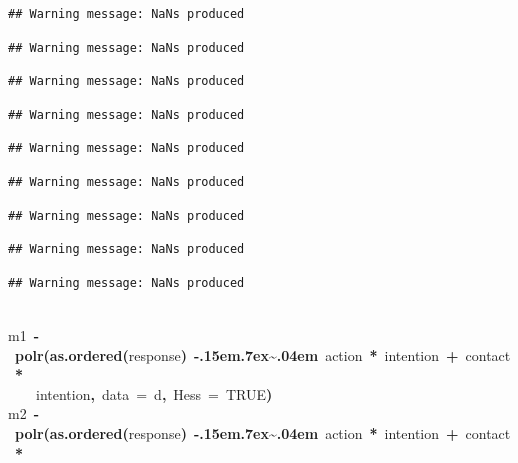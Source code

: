\documentclass{article}
\makeatletter
\newcommand{\hlnumber}[1]{\textcolor[rgb]{0,0,0}{#1}}%
\newcommand{\hlfunctioncall}[1]{\textcolor[rgb]{.5,0,.33}{\textbf{#1}}}%
\newcommand{\hlkeyword}[1]{\textbf{#1}}%
\newcommand{\hlargument}[1]{\textcolor[rgb]{.69,.25,.02}{#1}}%
\newcommand{\hlassignement}[1]{\textbf{#1}}%
\newcommand{\hlsymbol}[1]{#1}%
\def\urltilda{\kern -.15em\lower .7ex\hbox{\~{}}\kern .04em}%
\newcommand{\hlstd}[1]{\textcolor[rgb]{0,0,0}{#1}}%
\newenvironment{kframe}{%
 \def\FrameCommand##1{\hskip\@totalleftmargin \hskip-\fboxsep
 \colorbox{shadecolor}{##1}\hskip-\fboxsep
     \hskip-\linewidth \hskip-\@totalleftmargin \hskip\columnwidth}%
 \MakeFramed {\advance\hsize-\width
   \@totalleftmargin\z@ \linewidth\hsize
   \@setminipage}}%
 {\par\unskip\endMakeFramed}
\newenvironment{knitrout}{}{} %
\makeatother
\begin{document}
\begin{knitrout}
{\begin{kframe}
\begin{verbatim}
## Warning message: NaNs produced
\end{verbatim}
\begin{verbatim}
## Warning message: NaNs produced
\end{verbatim}
\begin{verbatim}
## Warning message: NaNs produced
\end{verbatim}
\begin{verbatim}
## Warning message: NaNs produced
\end{verbatim}
\begin{verbatim}
## Warning message: NaNs produced
\end{verbatim}
\begin{verbatim}
## Warning message: NaNs produced
\end{verbatim}
\begin{verbatim}
## Warning message: NaNs produced
\end{verbatim}
\begin{verbatim}
## Warning message: NaNs produced
\end{verbatim}
\begin{verbatim}
## Warning message: NaNs produced
\end{verbatim}
\begin{flushleft}
\ttfamily\noindent
\hspace*{\fill}\\
\hlstd{}\hlsymbol{m1}{\ }\hlassignement{\usebox{\hlnormalsizeboxlessthan}-}{\ }\hlfunctioncall{polr}\hlkeyword{(}\hlfunctioncall{as.ordered}\hlkeyword{(}\hlsymbol{response}\hlkeyword{)}{\ }\hlkeyword{\urltilda{}}{\ }\hlsymbol{action}{\ }\hlkeyword{*}{\ }\hlsymbol{intention}{\ }\hlkeyword{+}{\ }\hlsymbol{contact}{\ }\hlkeyword{*}\hspace*{\fill}\\
\hlstd{}{\ }{\ }{\ }{\ }\hlsymbol{intention}\hlkeyword{,}{\ }\hlargument{data}{\ }\hlargument{=}{\ }\hlsymbol{d}\hlkeyword{,}{\ }\hlargument{Hess}{\ }\hlargument{=}{\ }\hlnumber{TRUE}\hlkeyword{)}\hspace*{\fill}\\
\hlstd{}\hlsymbol{m2}{\ }\hlassignement{\usebox{\hlnormalsizeboxlessthan}-}{\ }\hlfunctioncall{polr}\hlkeyword{(}\hlfunctioncall{as.ordered}\hlkeyword{(}\hlsymbol{response}\hlkeyword{)}{\ }\hlkeyword{\urltilda{}}{\ }\hlsymbol{action}{\ }\hlkeyword{*}{\ }\hlsymbol{intention}{\ }\hlkeyword{+}{\ }\hlsymbol{contact}{\ }\hlkeyword{*}\hspace*{\fill}\\

\end{flushleft}
\end{kframe}}
\end{knitrout}
\end{document}
